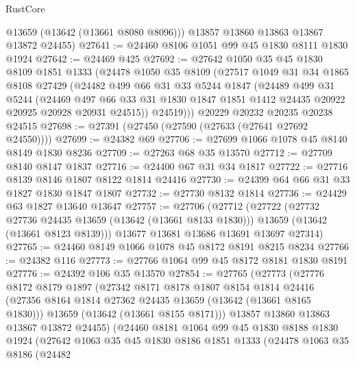 \begin{lexlean}{RustCore}
\begin{coremodule}
        @13659
        (@13642 (@13661 @8080 @8096)))
      @13857
      @13860
      @13863
      @13867
      @13872
      @24455)
@27641 := @24460 @8106 @1051 @99 @45 @1830 @8111 @1830 @1924
@27642 := @24469 @425
@27692 := @27642
    @1050
    @35
    @45
    @1830
    @8109
    @1851
    @1333
    (@24478
      @1050
      @35
      @8109
      (@27517
        @1049
        @31
        @34
        @1865
        @8108
        @27429
        (@24482
          @499
          @66
          @31
          @33
          @5244
          @1847
          (@24489
            @499
            @31
            @5244
            (@24469
              @497
              @66
              @33
              @31
              @1830
              @1847
              @1851
              @1412
              @24435
              @20922
              @20925
              @20928
              @20931
              @24515))
          @24519)))
    @20229
    @20232
    @20235
    @20238
    @24515
@27698 := @27391 (@27450 (@27590 (@27633 (@27641 @27692 @24550))))
@27699 := @24382 @69
@27706 := @27699 @1066 @1078 @45 @8140 @8149 @1830 @8236
@27709 := @27263 @68 @35 @13570
@27712 := @27709 @8140 @8147 @1837
@27716 := @24400 @67 @31 @34 @1817
@27722 := @27716 @8139 @8146 @1807 @8122 @1814 @24416
@27730 := @24399 @64 @66 @31 @33 @1827 @1830 @1847 @1807
@27732 := @27730 @8132 @1814
@27736 := @24429 @63 @1827 @13640 @13647
@27757 := @27706
    (@27712
      (@27722
        (@27732 @27736 @24435 @13659 (@13642 (@13661 @8133 @1830)))
        @13659
        (@13642 (@13661 @8123 @8139)))
      @13677
      @13681
      @13686
      @13691
      @13697
      @27314)
@27765 := @24460 @8149 @1066 @1078 @45 @8172 @8191 @8215 @8234
@27766 := @24382 @116
@27773 := @27766 @1064 @99 @45 @8172 @8181 @1830 @8191
@27776 := @24392 @106 @35 @13570
@27854 := @27765
    (@27773
      (@27776
        @8172
        @8179
        @1897
        (@27342
          @8171
          @8178
          @1807
          @8154
          @1814
          @24416
          (@27356 @8164 @1814 @27362 @24435 @13659 (@13642 (@13661 @8165 @1830)))
          @13659
          (@13642 (@13661 @8155 @8171)))
        @13857
        @13860
        @13863
        @13867
        @13872
        @24455)
      (@24460
        @8181
        @1064
        @99
        @45
        @1830
        @8188
        @1830
        @1924
        (@27642
          @1063
          @35
          @45
          @1830
          @8186
          @1851
          @1333
          (@24478
            @1063
            @35
            @8186
            (@24482

\end{coremodule}
\end{lexlean}
